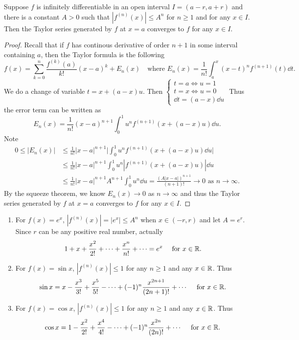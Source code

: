 \documentclass[a4paper]{ctexart}
\begin{document}
    \begin{mythm}
        Suppose $f$ is infinitely differentiable in an open interval $I = (a-r,a+r)$ and there is a constant $A>0$ such that $|f^{(n)}(x)| \le A^n$ for $n\ge 1$ and for any $x\in I$. Then the Taylor series generated by $f$ at $x=a$ converges to $f$ for any $x\in I$.
    \end{mythm}
    \begin{proof}
        Recall that if $f$ has continous derivative of order $n+1$ in some interval containing $a$, then the Taylor formula is the following
        $$
        f(x) = \sum_{k=0}^n \frac{f^{(k)}(a)}{k!} (x-a)^k + E_n(x) \quad \text{where } E_n(x) = \frac1{n!} \int_a^x (x-t)^n f^{(n+1)}(t) \dd t.
        $$
        We do a change of variable $t=x+(a-x)u$. Then $\displaystyle \begin{cases}
            t=a \Leftrightarrow u=1 \\
            t=x \Leftrightarrow u=0 \\
            \dd t = (a-x) \dd u
        \end{cases}
        $
        Thus the error term can be written as
        \[
        E_n(x) = \frac1{n!} (x-a)^{n+1} \int_0^1 u^n f^{(n+1)}(x+(a-x)u) \dd u.
        \]
        Note 
        $$
        \begin{aligned}
            0 \le |E_n(x)| &\le \frac{1}{n!}|x-a|^{n+1} \Big|\int_0^1 u^n f^{(n+1)}(x+(a-x)u) \dd u \Big|\\
            &\le \frac{1}{n!} |x-a|^{n+1}\int_0^1 u^n |f^{(n+1)}(x+(a-x)u)| \dd u\\
            &\le \frac{1}{n!}|x-a|^{n+1} A^{n+1} \int_0^1 u^n \dd u = \frac{(A|x-a|)^{n+1}}{(n+1)!} \to 0 \text{ as } n\to \infty.
        \end{aligned}
        $$
        By the squeeze theorem, we know $E_n(x) \to 0$ as $n\to \infty$ and thus the Taylor series generated by $f$ at $x=a$ converges to $f$ for any $x\in I$.
    \end{proof}
    \begin{myex}
        \leavevmode
        \begin{enumerate}
            \item For $f(x) = e^x$,  $|f^{(n)}(x)| = |e^x|\le A^n$ when $x\in (-r,r)$ and let $A=e^r$. Since $r$ can be any positive real number, actually
            $$
            1+x+\frac{x^2}{2!}+\cdots + \frac{x^n}{n!} + \cdots = e^x \quad \text{ for } x \in \mathbb{R}.
            $$
            \item For $f(x) = \sin x$, $|f^{(n)}(x)| \le 1$ for any $n\ge 1$ and any $x\in \mathbb{R}$. Thus
            $$
            \sin x = x - \frac{x^3}{3!} + \frac{x^5}{5!} - \cdots + (-1)^n \frac{x^{2n+1}}{(2n+1)!} + \cdots \quad \text{ for } x\in \mathbb{R}.
            $$
            \item For $f(x) = \cos x$, $|f^{(n)}(x)| \le 1$ for any $n\ge 1$ and any $x\in \mathbb{R}$. Thus
            $$
            \cos x = 1 - \frac{x^2}{2!} + \frac{x^4}{4!} - \cdots + (-1)^n \frac{x^{2n}}{(2n)!} + \cdots \quad \text{ for } x\in \mathbb{R}.
            $$
        \end{enumerate}
    \end{myex}
\end{document}
